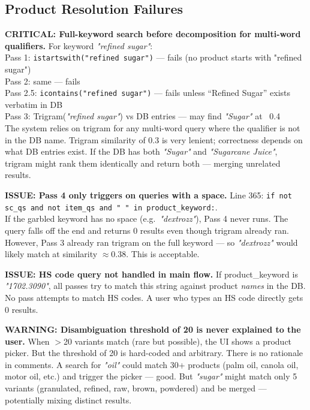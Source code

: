 \documentclass[12pt,a4paper]{article}
\begin{document}
\subsection{Product Resolution Failures}

\begin{issueBox}
\textbf{CRITICAL: Full-keyword search before decomposition for multi-word qualifiers.}
For keyword \textit{"refined sugar"}: \\
Pass 1: \texttt{istartswith("refined sugar")} --- fails (no product starts with "refined sugar") \\
Pass 2: same --- fails \\
Pass 2.5: \texttt{icontains("refined sugar")} --- fails unless ``Refined Sugar'' exists verbatim in DB \\
Pass 3: Trigram(\textit{"refined sugar"}) vs DB entries --- may find \textit{"Sugar"} at ~0.4 \\
The system relies on trigram for any multi-word query where the qualifier is not in the DB name.
Trigram similarity of 0.3 is very lenient; correctness depends on what DB entries exist.
If the DB has both \textit{"Sugar"} and \textit{"Sugarcane Juice"}, trigram might rank them
identically and return both --- merging unrelated results.
\end{issueBox}

\begin{issueBox}
\textbf{ISSUE: Pass 4 only triggers on queries with a space.}
Line 365: \texttt{if not sc\_qs and not item\_qs and " " in product\_keyword:}. \\
If the garbled keyword has no space (e.g.\ \textit{"dextrozz"}), Pass 4 never runs.
The query falls off the end and returns 0 results even though trigram already ran.
However, Pass 3 already ran trigram on the full keyword --- so \textit{"dextrozz"} would
likely match at similarity $\approx$0.38. This is acceptable.
\end{issueBox}

\begin{issueBox}
\textbf{ISSUE: HS code query not handled in main flow.}
If product\_keyword is \textit{"1702.3090"}, all passes try to match this string against
product \textit{names} in the DB. No pass attempts to match HS codes. A user who types
an HS code directly gets 0 results.
\end{issueBox}

\begin{warnBox}
\textbf{WARNING: Disambiguation threshold of 20 is never explained to the user.}
When $>$20 variants match (rare but possible), the UI shows a product picker. But the
threshold of 20 is hard-coded and arbitrary. There is no rationale in comments. A
search for \textit{"oil"} could match 30+ products (palm oil, canola oil, motor oil,
etc.) and trigger the picker --- good. But \textit{"sugar"} might match only 5 variants
(granulated, refined, raw, brown, powdered) and be merged --- potentially mixing distinct
results.
\end{warnBox}
\end{document}
